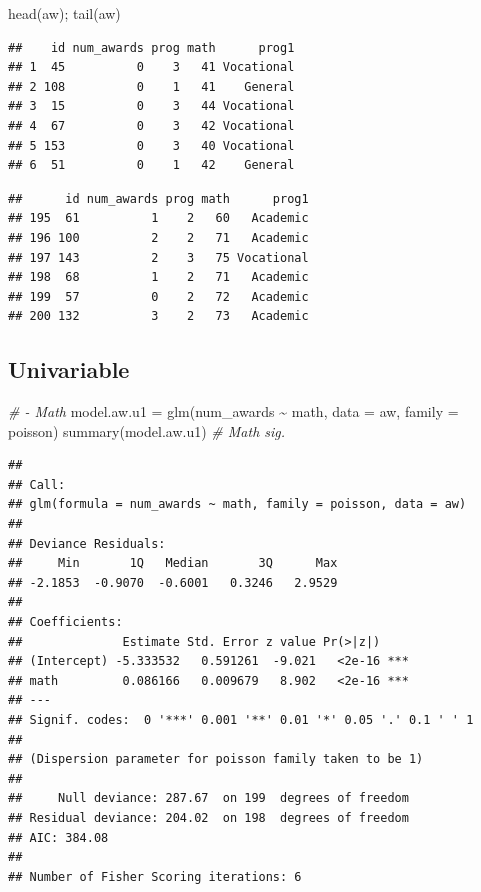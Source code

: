 \documentclass[
]{book}
\makeatletter
\newenvironment{Shaded}{\begin{snugshade}}{\end{snugshade}}
\newcommand{\AttributeTok}[1]{\textcolor[rgb]{0.61,0.61,0.61}{#1}}
\newcommand{\CommentTok}[1]{\textcolor[rgb]{0.37,0.37,0.37}{\textit{#1}}}
\newcommand{\FunctionTok}[1]{\textcolor[rgb]{0,0,0}{#1}}
\newcommand{\NormalTok}[1]{#1}
\newcommand{\OtherTok}[1]{\textcolor[rgb]{0.37,0.37,0.37}{#1}}
\newcommand{\SpecialCharTok}[1]{\textcolor[rgb]{0,0,0}{#1}}
\newenvironment{kframe}{%
\medskip{}
\setlength{\fboxsep}{.8em}
 \def\at@end@of@kframe{}%
 \ifinner\ifhmode%
  \def\at@end@of@kframe{\end{minipage}}%
  \begin{minipage}{\columnwidth}%
 \fi\fi%
 \def\FrameCommand##1{\hskip\@totalleftmargin \hskip-\fboxsep
 \colorbox{shadecolor}{##1}\hskip-\fboxsep
     \hskip-\linewidth \hskip-\@totalleftmargin \hskip\columnwidth}%
 \MakeFramed {\advance\hsize-\width
   \@totalleftmargin\z@ \linewidth\hsize
   \@setminipage}}%
 {\par\unskip\endMakeFramed%
 \at@end@of@kframe}
\renewenvironment{Shaded}{\begin{kframe}}{\end{kframe}}
\makeatother
\begin{document}
\begin{Shaded}
\begin{Highlighting}[]
\FunctionTok{head}\NormalTok{(aw); }\FunctionTok{tail}\NormalTok{(aw)}
\end{Highlighting}
\end{Shaded}

\begin{verbatim}
##    id num_awards prog math      prog1
## 1  45          0    3   41 Vocational
## 2 108          0    1   41    General
## 3  15          0    3   44 Vocational
## 4  67          0    3   42 Vocational
## 5 153          0    3   40 Vocational
## 6  51          0    1   42    General
\end{verbatim}

\begin{verbatim}
##      id num_awards prog math      prog1
## 195  61          1    2   60   Academic
## 196 100          2    2   71   Academic
## 197 143          2    3   75 Vocational
## 198  68          1    2   71   Academic
## 199  57          0    2   72   Academic
## 200 132          3    2   73   Academic
\end{verbatim}

\hypertarget{univariable-1}{%
\subsection{Univariable}\label{univariable-1}}

\begin{Shaded}
\begin{Highlighting}[]
\CommentTok{\# {-} Math}
\NormalTok{model.aw.u1 }\OtherTok{=} \FunctionTok{glm}\NormalTok{(num\_awards }\SpecialCharTok{\textasciitilde{}}\NormalTok{ math, }\AttributeTok{data =}\NormalTok{ aw, }\AttributeTok{family =}\NormalTok{ poisson)}
\FunctionTok{summary}\NormalTok{(model.aw.u1) }\CommentTok{\# Math sig.}
\end{Highlighting}
\end{Shaded}

\begin{verbatim}
## 
## Call:
## glm(formula = num_awards ~ math, family = poisson, data = aw)
## 
## Deviance Residuals: 
##     Min       1Q   Median       3Q      Max  
## -2.1853  -0.9070  -0.6001   0.3246   2.9529  
## 
## Coefficients:
##              Estimate Std. Error z value Pr(>|z|)    
## (Intercept) -5.333532   0.591261  -9.021   <2e-16 ***
## math         0.086166   0.009679   8.902   <2e-16 ***
## ---
## Signif. codes:  0 '***' 0.001 '**' 0.01 '*' 0.05 '.' 0.1 ' ' 1
## 
## (Dispersion parameter for poisson family taken to be 1)
## 
##     Null deviance: 287.67  on 199  degrees of freedom
## Residual deviance: 204.02  on 198  degrees of freedom
## AIC: 384.08
## 
## Number of Fisher Scoring iterations: 6
\end{verbatim}
\end{document}
